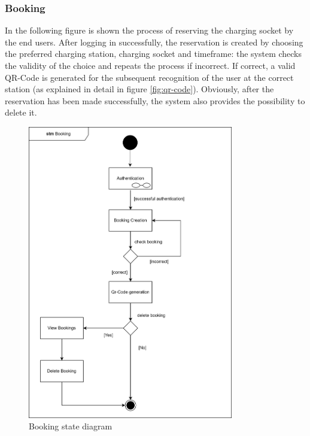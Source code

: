 \subsubsection{Booking}
In the following figure is shown the process of reserving the charging socket by the end users. After logging in successfully, the reservation is created by choosing the preferred charging station, charging socket and timeframe: the system checks the validity of the choice and repeats the process if incorrect. If correct, a valid QR-Code is generated for the subsequent recognition of the user at the correct station (as explained in detail in figure \ref{fig:qr-code}). Obviously, after the reservation has been made successfully, the system also provides the possibility to delete it.
\begin{figure}[H]
\begin{center}
\includegraphics[width=0.8\textwidth]{images/booking.png}
\caption{Booking state diagram}
\label{fig:booking}
\end{center}
\end{figure}
\clearpage
